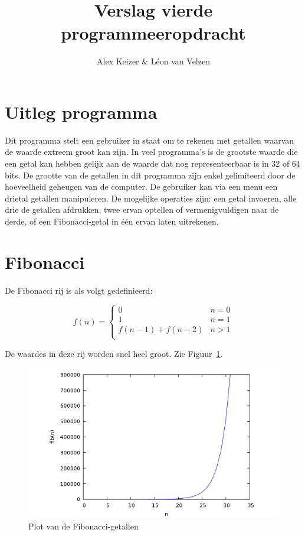 \documentclass[10pt]{article}
\title{\vspace{-1.3cm} Verslag vierde programmeeropdracht}
\author{Alex Keizer \& L\'{e}on van Velzen}
\begin{document}
\maketitle
\section{Uitleg programma}

Dit programma stelt een gebruiker in staat om te rekenen met getallen waarvan de waarde extreem groot kan zijn. In veel programma's is de grootste waarde die een getal kan hebben gelijk aan de waarde dat nog representeerbaar is in 32 of 64 bits. De grootte van de getallen in dit programma zijn enkel gelimiteerd door de hoeveelheid geheugen van de computer. De gebruiker kan via een menu een drietal getallen manipuleren. De mogelijke operaties zijn: een getal invoeren, alle drie de getallen afdrukken, twee ervan optellen of vermenigvuldigen naar de derde, of een Fibonacci-getal in \'e\'en ervan laten uitrekenen. 

\section{Fibonacci}

De Fibonacci rij is als volgt gedefinieerd:

\begin{equation*}
    f(n) = \begin{cases}
               0               & n = 0\\
               1               & n = 1\\
               f(n-1) + f(n-2) & n > 1\\
           \end{cases}
\end{equation*}

De waardes in deze rij worden snel heel groot. Zie Figuur~\ref{fig:fibo}.

\begin{figure}[!ht]
\begin{center}
    \includegraphics[scale=0.6]{graph.png}
\end{center}
\caption{Plot van de Fibonacci-getallen}\label{fig:fibo}
\end{figure}
\end{document}
